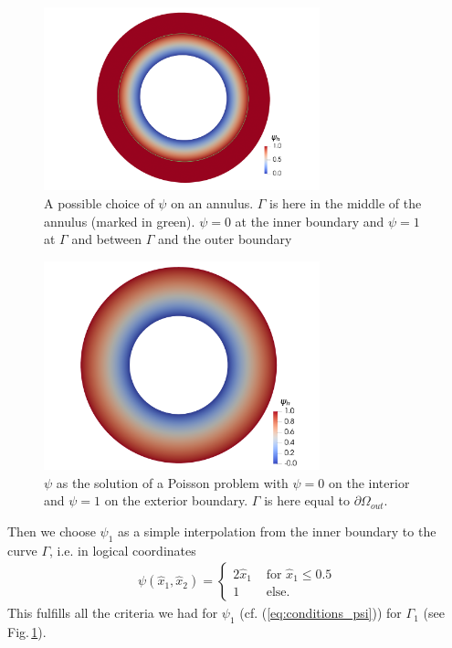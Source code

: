 \documentclass[../master_thesis.tex]{subfiles}
\begin{document}
\begin{figure}
    \centering
    \includegraphics[width=8cm]{plot_files/biot_savart_annulus/psi_h_inner_curve.png}
    \caption{A possible choice of $\psi$ on an annulus. $\Gamma$ is here in the 
    middle of the annulus (marked in green). $\psi = 0$ at the inner boundary and $\psi=1$ 
    at $\Gamma$ and between $\Gamma$ and the outer boundary}
    \label{fig:psi_annulus}
\end{figure}

\begin{figure}
    \centering 
    \includegraphics[width=8cm]{plot_files/biot_savart_annulus/psi_h_poisson.png}
    \caption{$\psi$ as the solution of a Poisson problem with $\psi=0$ 
    on the interior and $\psi = 1$ on the exterior boundary. $\Gamma$ 
    is here equal to $\partial \Omega_{out}$.}
    \label{fig:psi_poisson}
\end{figure}

Then we choose $\psi_1$ as a simple interpolation from the inner boundary to 
the curve $\Gamma$, i.e. in logical coordinates 
\begin{align}
    \psi(\hat{x}_1,\hat{x}_2) = \begin{cases}
        2 \hat{x}_1 & \text{ for $\hat{x}_1 \leq 0.5$} 
        \\ 1 & \text{ else}.
    \end{cases}\label{eq:linear_interpolation_psi}
\end{align}This fulfills all the criteria we had for $\psi_1$ (cf. (\ref{eq:conditions_psi})) for $\Gamma_1$ 
(see Fig.\,\ref{fig:psi_annulus}). 
\end{document}
